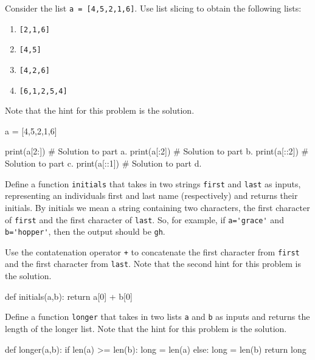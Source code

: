 \documentclass{ximera}
\begin{document}
\begin{question}
	Consider the list \verb|a = [4,5,2,1,6]|. Use list slicing to obtain the following lists:
	\begin{enumerate}
	\item \verb|[2,1,6]|
	\item \verb|[4,5]|
	\item \verb|[4,2,6]|
	\item \verb|[6,1,2,5,4]|
	\end{enumerate}
	Note that the hint for this problem is the solution.
	\begin{hint}
\begin{sageCell}
a = [4,5,2,1,6]

print(a[2:])  # Solution to part a.
print(a[:2])  # Solution to part b.
print(a[::2]) # Solution to part c.
print(a[::1]) # Solution to part d.
\end{sageCell}
	\end{hint}
\end{question}

\begin{question}
	Define a function \verb|initials| that takes in two strings \verb|first| and \verb|last| as inputs, representing an individuals first and last name (respectively) and returns their initials. By initials we mean a string containing two characters, the first character of \verb|first| and the first character of \verb|last|. So, for example, if \verb|a='grace'| and \verb|b='hopper'|, then the output should be \verb|gh|.
	\begin{hint}
	Use the contatenation operator \verb|+| to concatenate the first character from \verb|first| and the first character from \verb|last|. Note that the second hint for this problem is the solution.
	\end{hint}
	\begin{hint}
\begin{sageCell}
def initials(a,b):
	return a[0] + b[0]
\end{sageCell}
	\end{hint}
\end{question}

\begin{question}
Define a function \verb|longer| that takes in two lists \verb|a| and \verb|b| as inputs and returns the length of the longer list. Note that the hint for this problem is the solution.
	\begin{hint}
\begin{sageCell}
def longer(a,b):
        if len(a) >= len(b):
                long = len(a)
        else:
                long = len(b)
        return long
\end{sageCell}
	\end{hint}
\end{question}
\end{document}
